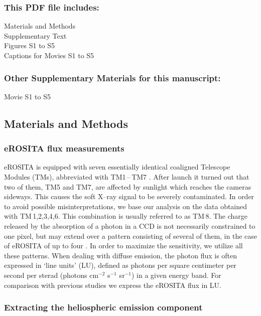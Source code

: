 \documentclass[12pt]{article}
\begin{document}
\subsubsection*{This PDF file includes:}
Materials and Methods\\
Supplementary Text\\
Figures S1 to S5\\
Captions for Movies S1 to S5\\

\subsubsection*{Other Supplementary Materials for this manuscript:}
Movie S1 to S5



\newpage

\subsection*{Materials and Methods}

\subsubsection*{eROSITA flux measurements}

eROSITA is equipped with seven essentially identical coaligned Telescope Modules (TMs), abbreviated with TM1\,--\,TM7 \cite{pre21a}. After launch it turned out that two of them, TM5 and TM7, are affected by sunlight which reaches the cameras sideways. This causes the soft X--ray signal to be severely contaminated. In order to avoid possible misinterpretations, we base our analysis on the data obtained with TM\,1,2,3,4,6. This combination is usually referred to as TM\,8. The charge released by the absorption of a photon in a CCD is not necessarily constrained to one pixel, but may extend over a pattern consisting of several of them, in the case of eROSITA of up to four \cite{den20a}. In order to maximize the sensitivity, we utilize all these patterns. When dealing with diffuse emission, the photon flux is often expressed in `line units' (LU), defined as photons per square centimeter per second per sterad (photons cm$^{-2}$ s$^{-1}$ sr$^{-1}$) in a given energy band. For comparison with previous studies we express the eROSITA flux in LU.

\subsubsection*{Extracting the heliospheric emission component}
\end{document}
